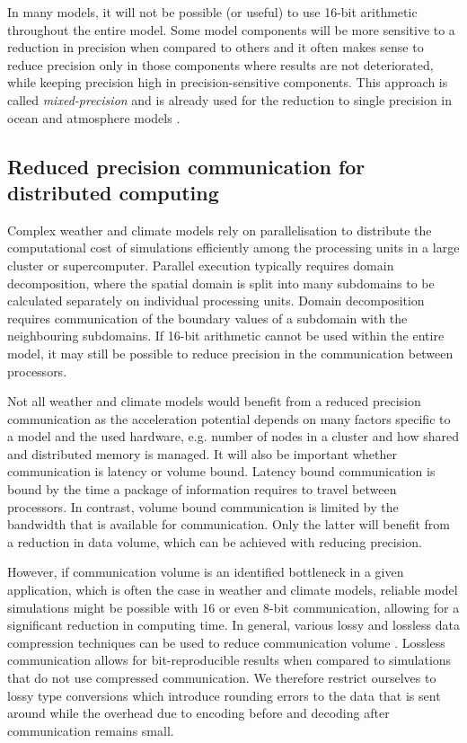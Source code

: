 In many models, it will not be possible (or useful) to use 16-bit arithmetic
throughout the entire model. Some model components will be more sensitive to a
reduction in precision when compared to others and it often makes sense to reduce
precision only in those components where results are not deteriorated, while
keeping precision high in precision-sensitive components. This approach is
called \emph{mixed-precision} and is already used for the reduction to single
precision in ocean and atmosphere models \citep{Vana2017,TintoPrims2019}.

\subsection{Reduced precision communication for distributed computing}

Complex weather and climate models rely on parallelisation to distribute the
computational cost of simulations efficiently among the processing units in a
large cluster or supercomputer. Parallel execution typically requires domain
decomposition, where the spatial domain is split into many subdomains to be
calculated separately on individual processing units. Domain decomposition
requires communication of the boundary values of a subdomain with the
neighbouring subdomains. If 16-bit arithmetic cannot be used within the
entire model, it may still be possible to reduce precision in the communication
between processors.

Not all weather and climate models would benefit from a reduced precision
communication as the acceleration potential depends on many factors specific
to a model and the used hardware, e.g. number of nodes in a cluster and how
shared and distributed memory is managed. It will also be important
whether communication is latency or volume bound. Latency bound communication is
bound by the time a package of information requires to travel between processors.
In contrast, volume bound communication is limited by the bandwidth that is
available for communication. Only the latter will benefit from a reduction in data
volume, which can be achieved with reducing precision.

However, if communication volume is an identified bottleneck in a given application,
which is often the case in weather and climate models, reliable model simulations
might be possible with 16 or even 8-bit communication, allowing for a significant
reduction in computing time. In general, various lossy and lossless data compression
techniques can be used to reduce communication volume \citep{Fan2019}. Lossless
communication allows for bit-reproducible results when compared to simulations that
do not use compressed communication. We therefore restrict ourselves to lossy type
conversions which introduce rounding errors to the data that is sent around while
the overhead due to encoding before and decoding after communication remains
small.

